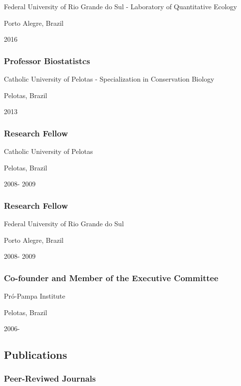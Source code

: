 \documentclass[
]{article}
\begin{document}
Federal University of Rio Grande do Sul - Laboratory of Quantitative
Ecology

Porto Alegre, Brazil

2016

\hypertarget{professor-biostatistcs}{%
\subsubsection{Professor Biostatistcs}\label{professor-biostatistcs}}

Catholic University of Pelotas - Specialization in Conservation Biology

Pelotas, Brazil

2013

\hypertarget{research-fellow-2}{%
\subsubsection{Research Fellow}\label{research-fellow-2}}

Catholic University of Pelotas

Pelotas, Brazil

2008- 2009

\hypertarget{research-fellow-3}{%
\subsubsection{Research Fellow}\label{research-fellow-3}}

Federal University of Rio Grande do Sul

Porto Alegre, Brazil

2008- 2009

\hypertarget{co-founder-and-member-of-the-executive-committee}{%
\subsubsection{Co-founder and Member of the Executive
Committee}\label{co-founder-and-member-of-the-executive-committee}}

Pró-Pampa Institute

Pelotas, Brazil

2006-

\hypertarget{publications}{%
\subsection{Publications}\label{publications}}

\hypertarget{peer-reviwed-journals}{%
\subsubsection{Peer-Reviwed Journals}\label{peer-reviwed-journals}}
\end{document}
